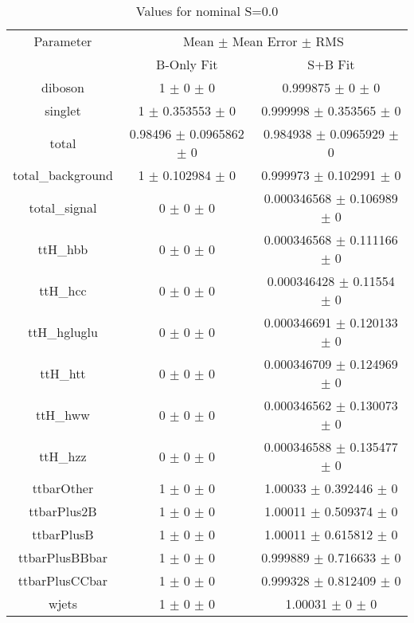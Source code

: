 \begin{table}
\centering
\caption{Values for nominal S=0.0}
\begin{tabular}{ccc}
\toprule
Parameter & \multicolumn{2}{c}{Mean $\pm$ Mean Error $\pm$ RMS}\\
 & B-Only Fit & S+B Fit\\
\midrule
diboson & \num{1} $\pm$ \num{0} $\pm$ \num{0} & \num{0.999875} $\pm$ \num{0} $\pm$ \num{0}\\
singlet & \num{1} $\pm$ \num{0.353553} $\pm$ \num{0} & \num{0.999998} $\pm$ \num{0.353565} $\pm$ \num{0}\\
total & \num{0.98496} $\pm$ \num{0.0965862} $\pm$ \num{0} & \num{0.984938} $\pm$ \num{0.0965929} $\pm$ \num{0}\\
total\_background & \num{1} $\pm$ \num{0.102984} $\pm$ \num{0} & \num{0.999973} $\pm$ \num{0.102991} $\pm$ \num{0}\\
total\_signal & \num{0} $\pm$ \num{0} $\pm$ \num{0} & \num{0.000346568} $\pm$ \num{0.106989} $\pm$ \num{0}\\
ttH\_hbb & \num{0} $\pm$ \num{0} $\pm$ \num{0} & \num{0.000346568} $\pm$ \num{0.111166} $\pm$ \num{0}\\
ttH\_hcc & \num{0} $\pm$ \num{0} $\pm$ \num{0} & \num{0.000346428} $\pm$ \num{0.11554} $\pm$ \num{0}\\
ttH\_hgluglu & \num{0} $\pm$ \num{0} $\pm$ \num{0} & \num{0.000346691} $\pm$ \num{0.120133} $\pm$ \num{0}\\
ttH\_htt & \num{0} $\pm$ \num{0} $\pm$ \num{0} & \num{0.000346709} $\pm$ \num{0.124969} $\pm$ \num{0}\\
ttH\_hww & \num{0} $\pm$ \num{0} $\pm$ \num{0} & \num{0.000346562} $\pm$ \num{0.130073} $\pm$ \num{0}\\
ttH\_hzz & \num{0} $\pm$ \num{0} $\pm$ \num{0} & \num{0.000346588} $\pm$ \num{0.135477} $\pm$ \num{0}\\
ttbarOther & \num{1} $\pm$ \num{0} $\pm$ \num{0} & \num{1.00033} $\pm$ \num{0.392446} $\pm$ \num{0}\\
ttbarPlus2B & \num{1} $\pm$ \num{0} $\pm$ \num{0} & \num{1.00011} $\pm$ \num{0.509374} $\pm$ \num{0}\\
ttbarPlusB & \num{1} $\pm$ \num{0} $\pm$ \num{0} & \num{1.00011} $\pm$ \num{0.615812} $\pm$ \num{0}\\
ttbarPlusBBbar & \num{1} $\pm$ \num{0} $\pm$ \num{0} & \num{0.999889} $\pm$ \num{0.716633} $\pm$ \num{0}\\
ttbarPlusCCbar & \num{1} $\pm$ \num{0} $\pm$ \num{0} & \num{0.999328} $\pm$ \num{0.812409} $\pm$ \num{0}\\
wjets & \num{1} $\pm$ \num{0} $\pm$ \num{0} & \num{1.00031} $\pm$ \num{0} $\pm$ \num{0}\\
\bottomrule
\end{tabular}
\end{table}